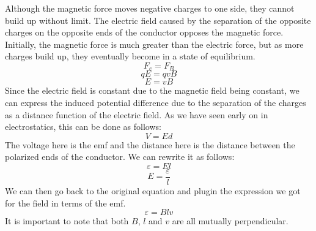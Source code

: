 \documentclass[11pt]{article}
\begin{document}
	Although the magnetic force moves negative charges to one side, they cannot build up without limit. The electric field caused by the separation of the opposite charges on the opposite ends of the conductor opposes the magnetic force. Initially, the magnetic force is much greater than the electric force, but as more charges build up, they eventually become in a state of equilibrium.
	$$F_e=F_B$$
	$$qE=qvB$$
	$$E=vB$$
	Since the electric field is constant due to the magnetic field being constant, we can express the induced potential difference due to the separation of the charges as a distance function of the electric field. As we have seen early on in electrostatics, this can be done as follows:
	$$V=Ed$$
	The voltage here is the emf and the distance here is the distance between the polarized ends of the conductor. We can rewrite it as follows:
	$$\varepsilon=El$$
	$$E=\dfrac{\varepsilon}{l}$$
	We can then go back to the original equation and plugin the expression we got for the field in terms of the emf.
	$$\varepsilon=Blv$$
	It is important to note that both $B$, $l$ and $v$ are all mutually perpendicular.
\end{document}
